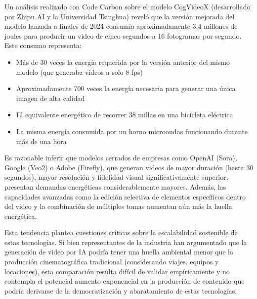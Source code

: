 Un análisis realizado con Code Carbon sobre el modelo CogVideoX (desarrollado por Zhipu AI y la Universidad Tsinghua) reveló que la versión mejorada del modelo lanzada a finales de 2024 consumía aproximadamente 3.4 millones de joules para producir un video de cinco segundos a 16 fotogramas por segundo. Este consumo representa:

\begin{itemize}
    \item Más de 30 veces la energía requerida por la versión anterior del mismo modelo (que generaba videos a solo 8 fps)
    \item Aproximadamente 700 veces la energía necesaria para generar una única imagen de alta calidad
    \item El equivalente energético de recorrer 38 millas en una bicicleta eléctrica
    \item La misma energía consumida por un horno microondas funcionando durante más de una hora
\end{itemize}

Es razonable inferir que modelos cerrados de empresas como OpenAI (Sora), Google (Veo2) o Adobe (Firefly), que generan videos de mayor duración (hasta 30 segundos), mayor resolución y fidelidad visual significativamente superior, presentan demandas energéticas considerablemente mayores. Además, las capacidades avanzadas como la edición selectiva de elementos específicos dentro del video y la combinación de múltiples tomas aumentan aún más la huella energética.

Esta tendencia plantea cuestiones críticas sobre la escalabilidad sostenible de estas tecnologías. Si bien representantes de la industria han argumentado que la generación de video por IA podría tener una huella ambiental menor que la producción cinematográfica tradicional (considerando viajes, equipos y locaciones), esta comparación resulta difícil de validar empíricamente y no contempla el potencial aumento exponencial en la producción de contenido que podría derivarse de la democratización y abaratamiento de estas tecnologías.